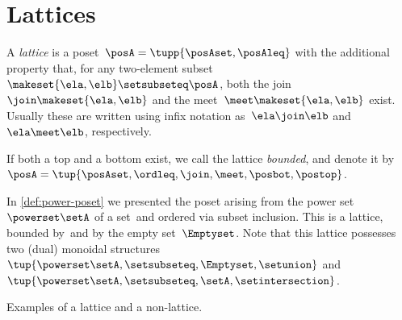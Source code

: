 
\section{Lattices}


\begin{definition}[Lattice]
    \label{def:lattice}
    A \emph{lattice} is a poset~$\posA=\tupp{\posAset,\posAleq}$ with the additional property that, for any two-element subset~$\makeset{\ela, \elb} \setsubseteq \posA$, both the join~$\join \makeset{\ela, \elb}$ and the meet~$\meet \makeset{\ela, \elb }$ exist.
    Usually these are written using infix notation as~$\ela \join \elb$ and~$\ela \meet \elb$, respectively.
\end{definition}

\begin{marginfigure}
    \centering
    \caption{}
    \label{fig:lattice-wood}
\end{marginfigure}

\begin{remark}
    \label{rem:bounded-lattices}
    If both a top and a bottom exist, we call the lattice \emph{bounded}, and denote it by~$\posA = \tup{\posAset,\ordleq,\join,\meet,\posbot,\postop}$.
\end{remark}

\begin{example}
    In \cref{def:power-poset} we presented the poset arising from the power set~$\powerset \setA$ of a set~\setA and ordered via subset inclusion.
    This is a lattice, bounded by~\setA and by the empty set~$\Emptyset$.
    Note that this lattice possesses two (dual) monoidal structures~$\tup{\powerset \setA,\setsubseteq,\Emptyset,\setunion}$ and~$\tup{\powerset \setA,\setsubseteq,\setA,\setintersection}$.
\end{example}

\begin{marginfigure}
    \centering

    \caption{Examples of a lattice and a non-lattice. }
    \label{fig:exlattice}
\end{marginfigure}

